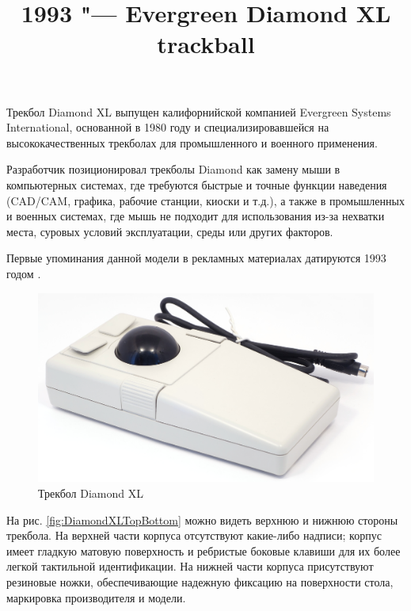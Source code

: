 \documentclass[11pt, a4paper]{article}
\begin{document}
\title{1993 "--- Evergreen Diamond XL trackball}
\date{}
\maketitle
{}
Трекбол Diamond XL выпущен калифорнийской компанией Evergreen Systems International, основанной в 1980 году и специализировавшейся на высококачественных трекболах для промышленного и военного применения.

Разработчик позиционировал трекболы Diamond как замену мыши в компьютерных системах, где требуются быстрые и точные функции наведения (CAD/CAM, графика, рабочие станции, киоски и т.д.), а также в промышленных и военных системах, где мышь не подходит для использования из-за нехватки места, суровых условий эксплуатации, среды или других факторов.

Первые упоминания данной модели в рекламных материалах датируются 1993 годом \cite{nasa}.

\begin{figure}[h]
    \centering
    \includegraphics[scale=0.3]{1993_evergreen_diamond_xl_trackball/pic_30.jpg}
    \caption{Трекбол Diamond XL}
    \label{fig:DiamondXL}
\end{figure}

На рис. \ref{fig:DiamondXLTopBottom} можно видеть верхнюю и нижнюю стороны трекбола.
На верхней части корпуса отсутствуют какие-либо надписи; корпус имеет гладкую матовую поверхность и ребристые боковые клавиши для их более легкой тактильной идентификации. На нижней части корпуса присутствуют резиновые ножки, обеспечивающие надежную фиксацию на поверхности стола, маркировка производителя и модели.
\end{document}
